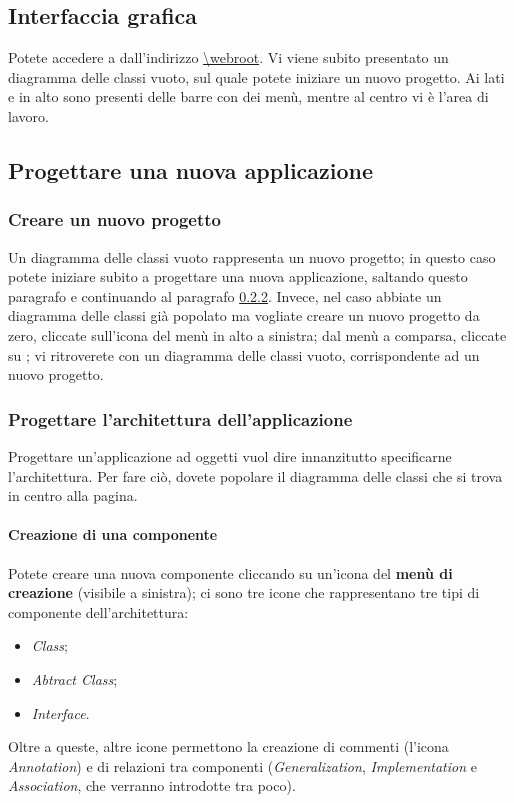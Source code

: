 \subsection{Interfaccia grafica} \label{sec:gui}

Potete accedere a \proj{} dall'indirizzo \url{\webroot}. Vi viene subito presentato un diagramma delle classi vuoto, sul quale potete iniziare un nuovo progetto. Ai lati e in alto sono presenti delle barre con dei menù, mentre al centro vi è l'area di lavoro.



\subsection{Progettare una nuova applicazione} \label{sec:new}

\subsubsection{Creare un nuovo progetto}
Un diagramma delle classi vuoto rappresenta un nuovo progetto; in questo caso potete iniziare subito a progettare una nuova applicazione, saltando questo paragrafo e continuando al paragrafo \ref{par:arch}. Invece, nel caso abbiate un diagramma delle classi già popolato ma vogliate creare un nuovo progetto da zero, cliccate sull'icona del menù in alto a sinistra; dal menù a comparsa, cliccate su ; vi ritroverete con un diagramma delle classi vuoto, corrispondente ad un nuovo progetto.

\subsubsection{Progettare l'architettura dell'applicazione} \label{par:arch}
Progettare un'applicazione ad oggetti vuol dire innanzitutto specificarne l'architettura. Per fare ciò, dovete popolare il diagramma delle classi che si trova in centro alla pagina.

\paragraph{Creazione di una componente} Potete creare una nuova componente cliccando su un'icona del \textbf{menù di creazione} (visibile a sinistra); ci sono tre icone che rappresentano tre tipi di componente dell'architettura:
\begin{itemize}
	\item \emph{Class};
	\item \emph{Abtract Class};
	\item \emph{Interface}.
\end{itemize}
Oltre a queste, altre icone permettono la creazione di commenti (l'icona \emph{Annotation}) e di relazioni tra componenti (\emph{Generalization}, \emph{Implementation} e \emph{Association}, che verranno introdotte tra poco).

